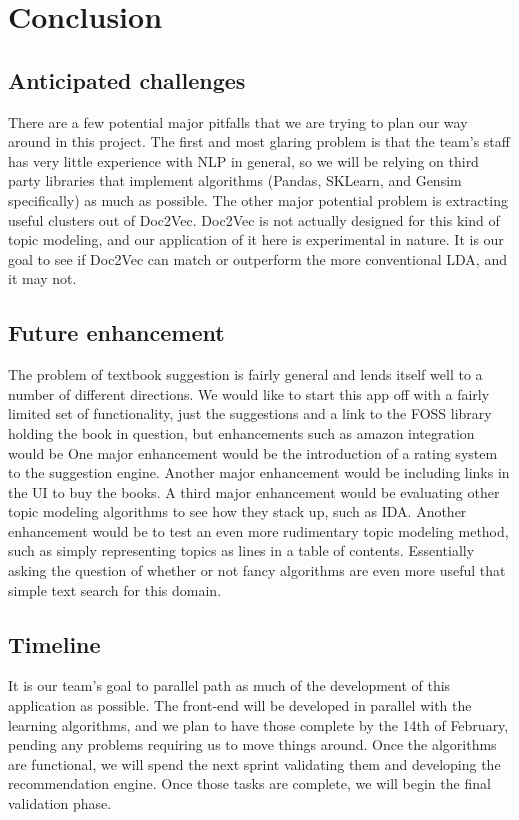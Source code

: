 
\section{Conclusion}
\subsection{Anticipated challenges}
There are a few potential major pitfalls that we are trying to plan our way around in this project.  
The first and most glaring problem is that the team's staff has very little experience with NLP in general, so we will be relying on third party libraries that implement algorithms (Pandas, SKLearn, and Gensim specifically) as much as possible.
The other major potential problem is extracting useful clusters out of Doc2Vec.  
Doc2Vec is not actually designed for this kind of topic modeling, and our application of it here is experimental in nature. 
It is our goal to see if Doc2Vec can match or outperform the more conventional LDA, and it may not.  

\subsection{Future enhancement}
The problem of textbook suggestion is fairly general and lends itself well to a number of different directions.
We would like to start this app off with a fairly limited set of functionality, just the suggestions and a link to the FOSS library holding the book in question, but enhancements such as amazon integration would be 
One major enhancement would be the introduction of a rating system to the suggestion engine.  
Another major enhancement would be including links in the UI to buy the books.
A third major enhancement would be evaluating other topic modeling algorithms to see how they stack up, such as IDA.
Another enhancement would be to test an even more rudimentary topic modeling method, such as simply representing topics as lines in a table of contents.  
Essentially asking the question of whether or not fancy algorithms are even more useful that simple text search for this domain.

\subsection{Timeline}
It is our team's goal to parallel path as much of the development of this application as possible.
The front-end will be developed in parallel with the learning algorithms, and we plan to have those complete by the 14th of February, pending any problems requiring us to move things around.
Once the algorithms are functional, we will spend the next sprint validating them and developing the recommendation engine.
Once those tasks are complete, we will begin the final validation phase.